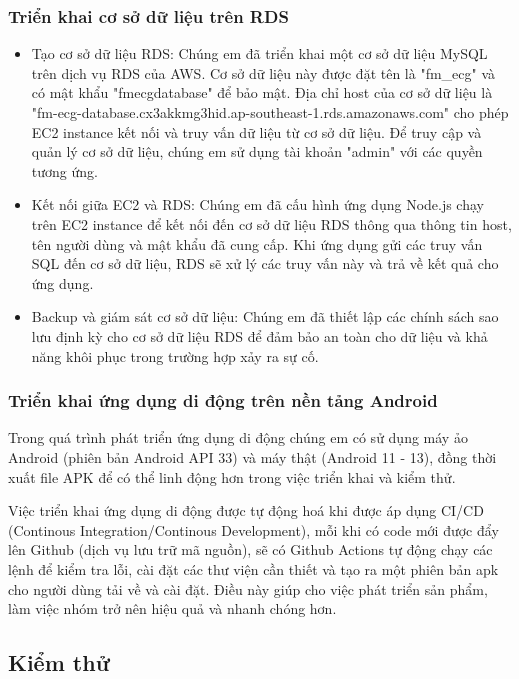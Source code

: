 \subsubsection{Triển khai cơ sở dữ liệu trên RDS}
\begin{itemize}
  \item Tạo cơ sở dữ liệu RDS: Chúng em đã triển khai một cơ sở dữ liệu MySQL trên dịch vụ RDS của AWS. Cơ sở dữ liệu này được đặt tên là "fm\_ecg" và có mật khẩu "fmecgdatabase" để bảo mật. Địa chỉ host của cơ sở dữ liệu là "fm-ecg-database.cx3akkmg3hid.ap-southeast-1.rds.amazonaws.com" cho phép EC2 instance kết nối và truy vấn dữ liệu từ cơ sở dữ liệu. Để truy cập và quản lý cơ sở dữ liệu, chúng em sử dụng tài khoản "admin" với các quyền tương ứng.
  \item Kết nối giữa EC2 và RDS: Chúng em đã cấu hình ứng dụng Node.js chạy trên EC2 instance để kết nối đến cơ sở dữ liệu RDS thông qua thông tin host, tên người dùng và mật khẩu đã cung cấp. Khi ứng dụng gửi các truy vấn SQL đến cơ sở dữ liệu, RDS sẽ xử lý các truy vấn này và trả về kết quả cho ứng dụng.
  \item Backup và giám sát cơ sở dữ liệu: Chúng em đã thiết lập các chính sách sao lưu định kỳ cho cơ sở dữ liệu RDS để đảm bảo an toàn cho dữ liệu và khả năng khôi phục trong trường hợp xảy ra sự cố.
\end{itemize}

\subsubsection{Triển khai ứng dụng di động trên nền tảng Android}
Trong quá trình phát triển ứng dụng di động chúng em có sử dụng máy ảo Android (phiên bản Android API 33) và máy thật
(Android 11 - 13), đồng thời xuất file APK để có thể linh động hơn trong việc triển khai và kiểm thử.

Việc triển khai ứng dụng di động được tự động hoá khi được áp dụng CI/CD (Continous Integration/Continous Development), mỗi khi có
code mới được đẩy lên Github (dịch vụ lưu trữ mã nguồn), sẽ có Github Actions tự động chạy các lệnh để kiểm tra lỗi, cài đặt
các thư viện cần thiết và tạo ra một phiên bản apk cho người dùng tải về và cài đặt. Điều này giúp cho việc phát triển sản phẩm, 
làm việc nhóm trở nên hiệu quả và nhanh chóng hơn.

\subsection{Kiểm thử}

